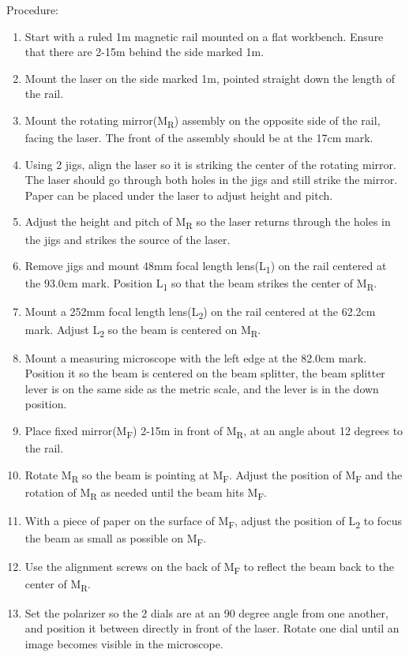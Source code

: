 \documentclass[12pt]{report}
\begin{document}
Procedure:
\begin{enumerate}
	\item Start with a ruled 1m magnetic rail mounted on a flat workbench. Ensure that there are 2-15m behind the side marked 1m.
	\item Mount the laser on the side marked 1m, pointed straight down the length of the rail.
	\item Mount the rotating mirror(M\textsubscript{R}) assembly on the opposite side of the rail, facing the laser. The front of the assembly should be at the 17cm mark. 
	\item Using 2 jigs, align the laser so it is striking the center of the rotating mirror. The laser should go through both holes in the jigs and still strike the mirror. Paper can be placed under the laser to adjust height and pitch.
	\item Adjust the height and pitch of M\textsubscript{R} so the laser returns through the holes in the jigs and strikes the source of the laser.
	\item Remove jigs and mount 48mm focal length lens(L\textsubscript{1}) on the rail centered at the 93.0cm mark. Position L\textsubscript{1} so that the beam strikes the center of M\textsubscript{R}.
	\item Mount a 252mm focal length lens(L\textsubscript{2}) on the rail centered at the 62.2cm mark. Adjust L\textsubscript{2} so the beam is centered on M\textsubscript{R}.
	\item Mount a measuring microscope with the left edge at the 82.0cm mark. Position it so the beam is centered on the beam splitter, the beam splitter lever is on the same side as the metric scale, and the lever is in the down position.
	\item Place fixed mirror(M\textsubscript{F}) 2-15m in front of M\textsubscript{R}, at an angle about 12 degrees to the rail.
	\item Rotate M\textsubscript{R} so the beam is pointing at M\textsubscript{F}. Adjust the position of M\textsubscript{F} and the rotation of M\textsubscript{R} as needed until the beam hits M\textsubscript{F}.
	\item With a piece of paper on the surface of M\textsubscript{F}, adjust the position of L\textsubscript{2} to focus the beam as small as possible on M\textsubscript{F}.
	\item Use the alignment screws on the back of M\textsubscript{F} to reflect the beam back to the center of M\textsubscript{R}.
	\item Set the polarizer so the 2 dials are at an 90 degree angle from one another, and position it between directly in front of the laser. Rotate one dial until an image becomes visible in the microscope. 

\end{enumerate}
\end{document}
